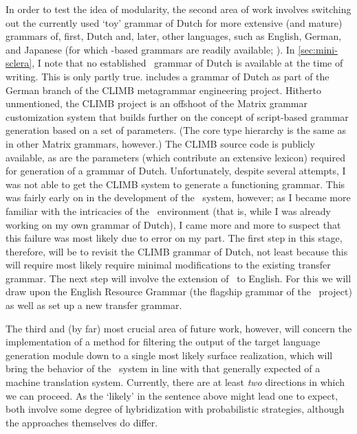 In order to test the idea of modularity, the second area of work involves
switching out the currently used `toy' grammar of Dutch for more extensive (and
mature) grammars of, first, Dutch and, later, other languages, such as English,
German, and Japanese (for which \delphin-based grammars are readily available;
\citet{flickinger2000building,muller2000hpsg,siegel2002efficient}). In
\cref{sec:mini-sclera}, I note that no established \delphin\ grammar of Dutch
is available at the time of writing. This is only partly true.
\citet{fokkens2011metagrammar} includes a grammar of Dutch as part of the
German branch of the CLIMB metagrammar engineering project. Hitherto
unmentioned, the CLIMB project is an offshoot of the Matrix grammar
customization system that builds further on the concept of script-based grammar
generation based on a set of parameters. (The core type hierarchy is the same
as in other Matrix grammars, however.) The CLIMB source code is publicly
available, as are the parameters (which contribute an extensive lexicon)
required for generation of a grammar of Dutch. Unfortunately, despite several
attempts, I was not able to get the CLIMB system to generate a functioning
grammar. This was fairly early on in the development of the \depicto\ system,
however; as I became more familiar with the intricacies of the \delphin\
environment (that is, while I was already working on my own grammar of Dutch),
I came more and more to suspect that this failure was most likely due to error
on my part. The first step in this stage, therefore, will be to revisit the
CLIMB grammar of Dutch, not least because this will require most likely require
minimal modifications to the existing transfer grammar. The next step will
involve the extension of \depicto\ to English. For this we will draw upon the
English Resource Grammar \citep{flickinger2000building} (the flagship grammar
of the \delphin\ project) as well as set up a new transfer grammar.

The third and (by far) most crucial area of future work, however, will concern
the implementation of a method for filtering the output of the target language
generation module down to a single most likely surface realization, which will
bring the behavior of the \depicto\ system in line with that generally expected
of a machine translation system. Currently, there are at least \emph{two}
directions in which we can proceed. As the `likely' in the sentence above might
lead one to expect, both involve some degree of hybridization with
probabilistic strategies, although the approaches themselves do differ.

